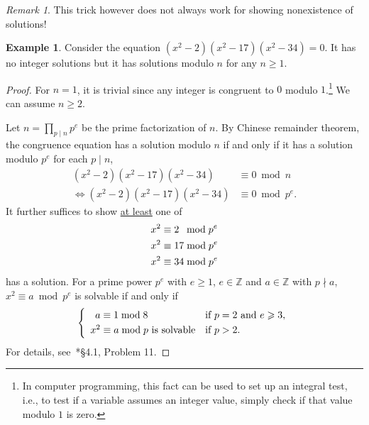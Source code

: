 \documentclass{amsbook}
\theoremstyle{plain}
\theoremstyle{definition}
\newtheorem{example}[theorem]{Example}
\theoremstyle{remark}
\newtheorem{remark}[theorem]{Remark}
\numberwithin{equation}{chapter}
\numberwithin{figure}{chapter}
\newcommand{\Z}{\mathbb{Z}}
\begin{document}
\begin{remark}
  This trick however does not always work for showing nonexistence of solutions!
\end{remark}

\begin{example}
  Consider the equation $(x^2 - 2)(x^2 - 17)(x^2 - 34) = 0$. It has no integer solutions but it has solutions modulo $n$ for any $n \geqslant 1$.
\end{example}
\begin{proof}
  For $n = 1$, it is trivial since any integer is congruent to $0$ modulo $1$.\footnote{In computer programming, this fact can be used to set up an integral test, i.e., to test if a variable assumes an integer value, simply check if that value modulo $1$ is zero.} We can assume $n \geqslant 2$.

  Let $n = \prod_{p \mid n} p^e$ be the prime factorization of $n$. By Chinese remainder theorem, the congruence equation has a solution modulo $n$ if and only if it has a solution modulo $p^e$ for each $p \mid n$,
  \begin{align}
    (x^2 - 2)(x^2 - 17)(x^2 - 34) &\equiv 0 \bmod n \\
    \iff    (x^2 - 2)(x^2 - 17)(x^2 - 34) &\equiv 0 \bmod p^e.
  \end{align}
   It further suffices to show \underline{at least} one of
  \begin{align}
\label{eqn:eqn3_day36}    x^2 &\equiv 2 \hspace{1.7mm}\bmod p^e \\
\label{eqn:eqn4_day36}    x^2 &\equiv 17 \bmod p^e \\
\label{eqn:eqn5_day36}    x^2 &\equiv 34 \bmod p^e 
  \end{align}
  has a solution. For a prime power $p^e$ with $e \geqslant 1$, $e \in \Z$ and $a \in \Z$ with $p \nmid a$, $x^2 \equiv a \bmod p^e$ is solvable if and only if
  \begin{align}\label{eqn:cong_mod_prime_pow}
    \begin{split}
    \left\{ \begin{array}{ll}
              \hspace{1.7mm} a \equiv 1 \bmod 8 & \text{if $p = 2$ and $e \geqslant 3$,} \\[1mm]
              x^2 \equiv a \bmod p \text{ is solvable} & \text{if $p > 2$.} \end{array} \right. 
        \end{split} 
 \end{align}
  For details, see~\cite{Strayer2001}*{\S 4.1, Problem 11}.


\end{proof}
\end{document}

